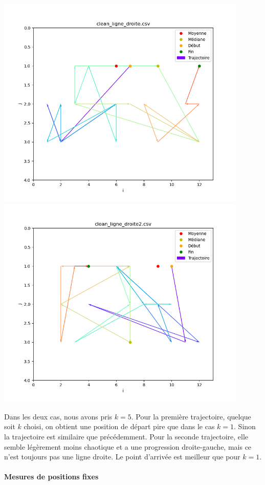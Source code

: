 \documentclass[french, a4paper, 12pt, parskip]{scrartcl}
\begin{document}
\begin{center}
  \includegraphics[width=0.9\textwidth]{finger2-l1.png}
  \includegraphics[width=0.9\textwidth]{finger2-l2.png}
\end{center}
Dans les deux cas, nous avons pris $k=5$. Pour la première trajectoire, quelque
soit $k$ choisi, on obtient une position de départ pire que dans le cas $k=1$.
Sinon la trajectoire est similaire que précédemment. Pour la seconde
trajectoire, elle semble légèrement moins chaotique et a une progression
droite-gauche, mais ce n'est toujours pas une ligne droite. Le point d'arrivée
est meilleur que pour $k=1$.

\paragraph{Mesures de positions fixes}
\end{document}
